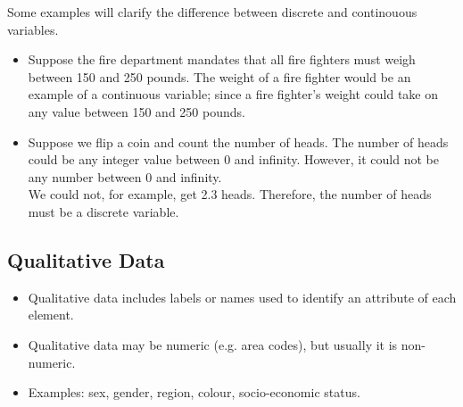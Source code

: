\documentclass[a4paper,12pt]{article}
\begin{document}
\begin{framed}
	Some examples will clarify the difference between discrete and continouous variables.
	
	\begin{itemize}
		\item Suppose the fire department mandates that all fire fighters must weigh between 150 and 250 pounds. The weight of a fire fighter would be an example of a continuous variable; since a fire fighter's weight could take on any value between 150 and 250 pounds. 
		\item	Suppose we flip a coin and count the number of heads. The number of heads could be any integer value between 0 and infinity. However, it could not be any number between 0 and infinity. \\ \smallskip We could not, for example, get 2.3 heads. Therefore, the number of heads must be a discrete variable. 
	\end{itemize}
\end{framed}




\subsection{Qualitative Data}
\begin{itemize}
	\item Qualitative data includes labels or names used to identify
	an attribute of each element. \item Qualitative data may be
	numeric (e.g. area codes), but usually it is non-numeric. \item
	Examples: sex, gender, region, colour, socio-economic status.
\end{itemize}

\end{document}
